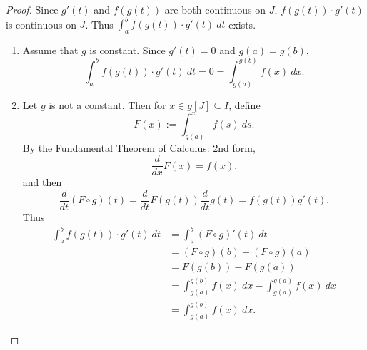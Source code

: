 \documentclass[12pt,openany]{book}
\theoremstyle{definition}
\begin{document}
	\begin{proof}
		Since $g'(t)$ and $f(g(t))$ are both continuous on $J$, $f(g(t))\cdot g'(t)$ is continuous on $J$. Thus $ \int_a^bf(g(t))\cdot g'(t)\ dt$ exists.
		\begin{enumerate}[(1)]
			\item Assume that $g$ is constant. Since $g'(t)=0$ and $g(a)=g(b)$, \[
			\int_a^bf(g(t))\cdot g'(t)\ dt=0=\int_{g(a)}^{g(b)}f(x)\ dx.
			\]
			\item Let $g$ is not a constant. Then for $x\in g[J]\subseteq I$, define \[
			F(x):=\int_{g(a)}^x f(s)\ ds.
			\] By the Fundamental Theorem of Calculus: 2nd form, \[
			\frac{d}{dx}F(x)=f(x).
			\] and then \[
			\frac{d}{dt}(F\circ g)(t)=\frac{d}{dt}F(g(t))\frac{d}{dt}g(t)=f(g(t))g'(t).
			\] Thus \begin{align*}
				\int_a^bf(g(t))\cdot g'(t)\ dt &= \int_a^b(F\circ g)'(t)\ dt\\
				&=(F\circ g)(b)-(F\circ g)(a)\\
				&=F(g(b))-F(g(a))\\
				&=\int_{g(a)}^{g(b)}f(x)\ dx-\int_{g(a)}^{g(a)}f(x)\ dx\\
				&=\int_{g(a)}^{g(b)}f(x)\ dx.
			\end{align*}
		\end{enumerate}
	\end{proof}
	
\end{document}
